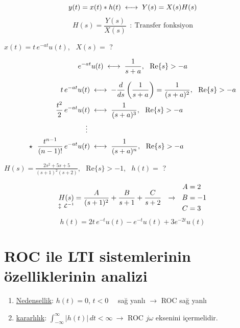 \documentclass[11pt,a4paper]{article}
\begin{document}
\begin{center}
\end{center}

\[ y(t)=x(t)*h(t)\;\longleftrightarrow\; Y(s)=X(s)H(s) \]
\[ H(s)=\frac{Y(s)}{X(s)}\ \ :\ \text{Transfer fonksiyon} \]

\begin{ornek}
  $x(t)=t\,e^{-at}u(t)$, \ $X(s)=$ ?
\end{ornek}
\[ e^{-at}u(t)\donusum\frac{1}{s+a},\ \ \mathrm{Re}\{s\}>-a \]

\nopagebreak
\begin{align*}
  t\,e^{-at}u(t) &\donusum -\frac{d}{ds}\left(\frac{1}{s+a}\right)=\frac{1}{(s+a)^2},\ \ \mathrm{Re}\{s\}>-a\\
  \frac{t^2}{2}\,e^{-at}u(t) &\donusum \frac{1}{(s+a)^3},\ \ \mathrm{Re}\{s\}>-a\\
  \vdots\ & \\
  \star\ \ \frac{t^{n-1}}{(n-1)!}\,e^{-at}u(t) &\donusum \frac{1}{(s+a)^n},\ \ \mathrm{Re}\{s\}>-a
\end{align*}

\begin{ornek}
  $\displaystyle H(s)=\frac{2s^2+5s+5}{(s+1)^2(s+2)}$, \ $\mathrm{Re}\{s\}>-1$, \ $h(t)=$ ?
\end{ornek}
\[ \underset{\mathclap{\updownarrow\ \mathcal{L}^{-1}}}{H(s)}=\frac{A}{(s+1)^2}+\frac{B}{s+1}+\frac{C}{s+2}\ \ \to\ \
\begin{aligned} A&=2\\ B&=-1\\ C&=3 \end{aligned} \]
\[ h(t)=2t\,e^{-t}u(t)-e^{-t}u(t)+3e^{-2t}u(t) \]

\section{ROC ile LTI sistemlerinin özelliklerinin analizi}
\begin{enumerate}[label=\arabic*), leftmargin=2em, itemsep=6pt]
  \item \underline{Nedensellik}: $h(t)=0$, $t<0$ \ \ sağ yanlı $\to$ ROC sağ yanlı
  \item \underline{kararlılık}: $\displaystyle\int_{-\infty}^{\infty}|h(t)|\,dt<\infty\ \to$ ROC $j\omega$ eksenini içermelidir.
\end{enumerate}
\end{document}
